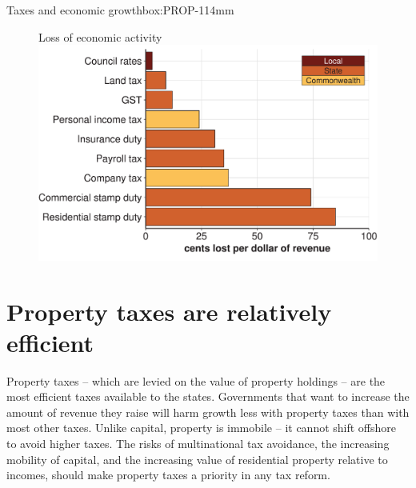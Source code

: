 \begin{bigboxCsep*}{Taxes and economic growth}{box:PROP-1}{14mm}
\begin{figure}[H]
%
{Loss of economic activity}
\includegraphics[width=\columnwidth]{Property-taxes/atlas/figure/Figure8-1.pdf}

\end{figure}

\end{bigboxCsep*}

\chapter{Property taxes are relatively efficient}
Property taxes – which are levied on the value of property holdings – are the most efficient taxes available to the states. Governments that want to increase the amount of revenue they raise will harm growth less with property taxes than with most other taxes. Unlike capital, property is immobile – it cannot shift offshore to avoid higher taxes. The risks of multinational tax avoidance, the increasing mobility of capital, and the increasing value of residential property relative to incomes, should make property taxes a priority in any tax reform.

